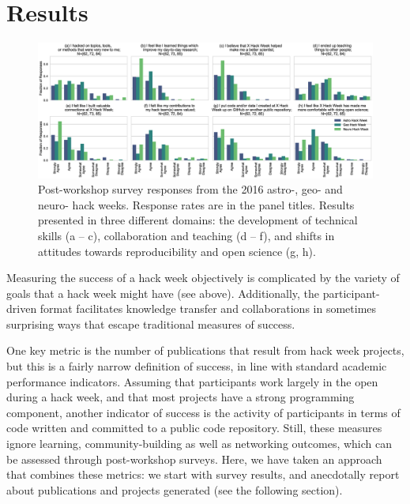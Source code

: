 \section*{Results}

\begin{figure}[h!]
\centering
\includegraphics[width=\textwidth]{f2.eps}
\caption{Post-workshop survey responses from the 2016 astro-, geo- and neuro- hack weeks. Response rates are in the panel titles. Results presented in three different domains: the development of technical skills (a -- c), collaboration and teaching (d -- f), and shifts in attitudes towards reproducibility and open science (g, h).}
\label{fig:survey}
\end{figure}

Measuring the success of a hack week objectively is complicated by the variety of goals that a hack week might have (see above).
Additionally, the participant-driven format facilitates knowledge transfer and collaborations in sometimes surprising ways that escape traditional measures of success.

One key metric is the number of publications that result from hack week projects, but this is a fairly narrow definition of success, in line with standard academic performance indicators.
Assuming that participants work largely in the open during a hack week, and that most projects have a strong programming component, another indicator of success is the activity of participants in terms of code written and committed to a public code repository.
Still, these measures ignore learning, community-building as well as networking outcomes, which can be assessed through post-workshop surveys.
Here, we have taken an approach that combines these metrics: we start with survey results, and anecdotally report about publications and projects generated (see the following section).

